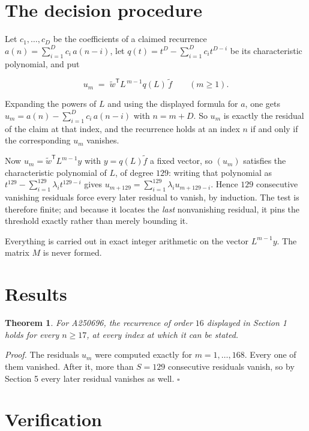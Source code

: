 \documentclass[11pt]{article}
\newtheorem{theorem}{Theorem}
\theoremstyle{definition}
\begin{document}
\section{The decision procedure}

Let $c_1,\dots,c_D$ be the coefficients of a claimed recurrence $a(n) = \sum_{i=1}^{D} c_i\,a(n-i)$, let $q(t) = t^{D} - \sum_{i=1}^{D} c_i t^{D-i}$ be its characteristic polynomial, and put

\[u_m \;=\; \tilde w^{\mathsf T} L^{\,m-1} q(L)\,\tilde f \qquad (m \ge 1).\]

Expanding the powers of $L$ and using the displayed formula for $a$, one gets $u_m = a(n) - \sum_{i=1}^{D} c_i\,a(n-i)$ with $n = m + D$. So $u_m$ is exactly the residual of the claim at that index, and the recurrence holds at an index $n$ if and only if the corresponding $u_m$ vanishes.

Now $u_m = \tilde w^{\mathsf T} L^{m-1} y$ with $y = q(L)\tilde f$ a fixed vector, so $(u_m)$ satisfies the characteristic polynomial of $L$, of degree $129$: writing that polynomial as $t^{129} - \sum_{i=1}^{129} \lambda_i t^{129-i}$ gives $u_{m+129} = \sum_{i=1}^{129} \lambda_i u_{m+129-i}$. Hence $129$ consecutive vanishing residuals force every later residual to vanish, by induction. The test is therefore finite; and because it locates the {\itshape last} nonvanishing residual, it pins the threshold exactly rather than merely bounding it.

Everything is carried out in exact integer arithmetic on the vector $L^{m-1}y$. The matrix $M$ is never formed.

\section{Results}

\begin{theorem} For A250696, the recurrence of order $16$ displayed in Section 1 holds for every $n \ge 17$, at every index at which it can be stated.\end{theorem}

{\itshape Proof.} The residuals $u_m$ were computed exactly for $m = 1,\dots,168$. Every one of them vanished. After it, more than $S = 129$ consecutive residuals vanish, so by Section 5 every later residual vanishes as well. $\square$

\section{Verification}
\end{document}
